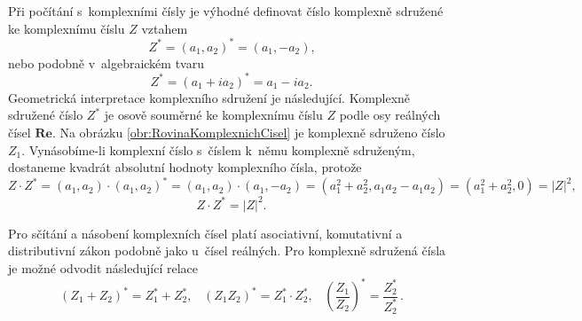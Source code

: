 Při počítání s~komplexními čísly je výhodné definovat číslo komplexně sdružené ke komplexnímu číslu $Z$ vztahem
\begin{equation}
Z^\ast = (a_1, a_2)^\ast = (a_1, -a_2) \mbox{,}
\label{rov:KomplexSdruzCislo-uspdvoj}
\end{equation}
nebo podobně v~algebraickém tvaru
\begin{equation}
Z^\ast = (a_1 + ia_2)^\ast = a_1 - ia_2 \mbox{.}
\end{equation}
Geometrická interpretace komplexního sdružení je následující. Komplexně sdružené číslo $Z^\ast$ je osově souměrné ke komplexnímu číslu $Z$ podle osy reálných čísel $\mathbf{Re}$. Na obrázku \ref{obr:RovinaKomplexnichCisel} je komplexně sdruženo číslo $Z_1$. Vynásobíme-li komplexní číslo s~číslem k~němu komplexně sdruženým, dostaneme kvadrát absolutní hodnoty komplexního čísla, protože
\begin{displaymath}
Z \cdot Z^\ast = (a_1, a_2) \cdot (a_1, a_2)^\ast = (a_1, a_2) \cdot (a_1, -a_2) = (a_1^2 + a_2^2, a_1a_2 - a_1a_2) = (a_1^2 + a_2^2, 0) = |Z|^2 \mbox{,}
\end{displaymath}
\begin{equation}
Z \cdot Z^\ast = |Z|^2 \mbox{.}
\label{rov:KvadradAbsolutniHodnoty}
\end{equation}

Pro sčítání a násobení komplexních čísel platí asociativní, komutativní a distributivní zákon podobně jako u~čísel reálných. Pro komplexně sdružená čísla je možné odvodit následující relace
\begin{equation}
(Z_1 + Z_2)^\ast = Z_1^\ast + Z_2^\ast \mbox{,} \quad (Z_1Z_2)^\ast = Z_1^\ast \cdot Z_2^\ast \mbox{,} \quad \left(\frac{Z_1}{Z_2}\right)^\ast = \frac{Z_2^\ast}{Z_2^\ast} \,\mbox{.}
\label{rov:OperaceSdruzCisla}
\end{equation}

